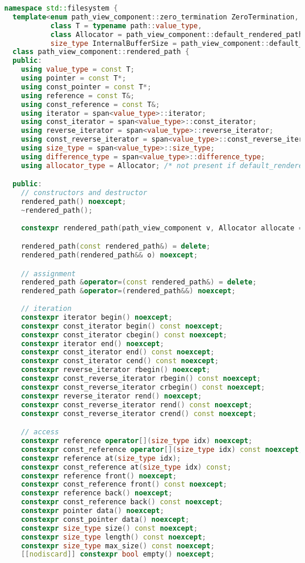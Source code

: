 \documentclass[11pt]{article}
\begin{document}
\begin{lstlisting}[language=cpp]
namespace std::filesystem {
  template<enum path_view_component::zero_termination ZeroTermination,
           class T = typename path::value_type,
           class Allocator = path_view_component::default_rendered_path_allocator<T>,
           size_type InternalBufferSize = path_view_component::default_internal_buffer_size>
  class path_view_component::rendered_path {
  public:
    using value_type = const T;
    using pointer = const T*;
    using const_pointer = const T*;
    using reference = const T&;
    using const_reference = const T&;
    using iterator = span<value_type>::iterator;
    using const_iterator = span<value_type>::const_iterator;
    using reverse_iterator = span<value_type>::reverse_iterator;
    using const_reverse_iterator = span<value_type>::const_reverse_iterator;
    using size_type = span<value_type>::size_type;
    using difference_type = span<value_type>::difference_type;
    using allocator_type = Allocator; /* not present if default_rendered_path_allocator tag type was used */

  public:
    // constructors and destructor
    rendered_path() noexcept;
    ~rendered_path();
    
    constexpr rendered_path(path_view_component v, Allocator allocate = Allocator());

    rendered_path(const rendered_path&) = delete;
    rendered_path(rendered_path&& o) noexcept;

    // assignment
    rendered_path &operator=(const rendered_path&) = delete;
    rendered_path &operator=(rendered_path&&) noexcept;
    
    // iteration
    constexpr iterator begin() noexcept;
    constexpr const_iterator begin() const noexcept;
    constexpr const_iterator cbegin() const noexcept;
    constexpr iterator end() noexcept;
    constexpr const_iterator end() const noexcept;
    constexpr const_iterator cend() const noexcept;
    constexpr reverse_iterator rbegin() noexcept;
    constexpr const_reverse_iterator rbegin() const noexcept;
    constexpr const_reverse_iterator crbegin() const noexcept;
    constexpr reverse_iterator rend() noexcept;
    constexpr const_reverse_iterator rend() const noexcept;
    constexpr const_reverse_iterator crend() const noexcept;

    // access
    constexpr reference operator[](size_type idx) noexcept;
    constexpr const_reference operator[](size_type idx) const noexcept;
    constexpr reference at(size_type idx);
    constexpr const_reference at(size_type idx) const;
    constexpr reference front() noexcept;
    constexpr const_reference front() const noexcept;
    constexpr reference back() noexcept;
    constexpr const_reference back() const noexcept;
    constexpr pointer data() noexcept;
    constexpr const_pointer data() noexcept;
    constexpr size_type size() const noexcept;
    constexpr size_type length() const noexcept;
    constexpr size_type max_size() const noexcept;
    [[nodiscard]] constexpr bool empty() noexcept;
    

\end{lstlisting}
\end{document}
